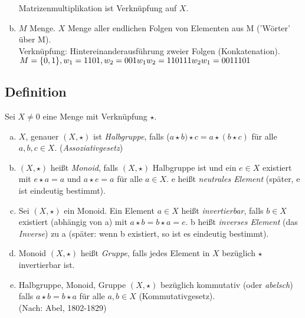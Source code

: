 \begin{enumerate}[a)]
Matrizenmultiplikation ist Verknüpfung auf $X$.
\item $M$ Menge. $X$ Menge aller endlichen Folgen von Elementen aus M ('Wörter' über M).\\
Verknüpfung: Hintereinanderausführung zweier Folgen (Konkatenation).\\
$M = \{0,1\}, w_1 = 1101, w_2 = 001\\
w_1w_2 = 110111\\
w_2w_1 = 0011101$\\
\end{enumerate}
\subsection{Definition}\label{sec:1.3}
Sei $X \ne 0$ eine Menge mit Verknüpfung $\star$.
\begin{enumerate}[a)]
\item $X$, genauer $(X,\star)$ ist \emph{Halbgruppe}, falls
($a \star b) \star c = a \star (b \star c)$ für alle $a,b,c \in X.$ (\emph{Assoziativgesetz})
\item $(X,\star)$ hei\ss t \emph{Monoid}, falls $(X,\star)$ Halbgruppe ist und ein $e \in X$ existiert mit $e \star a = a$ und $a \star e = a$ für alle $a \in X$. e hei\ss t \emph{neutrales Element} (später, e ist eindeutig bestimmt).
\item Sei $(X,\star)$ ein Monoid. Ein Element $a \in X$ hei\ss t \emph{invertierbar}, falls $b \in X$ existiert (abhängig von a) mit $a \star b = b \star a = e$. b hei\ss t \emph{inverses Element} (das \emph{Inverse}) zu a (später: wenn b existiert, so ist es eindeutig bestimmt).
\item Monoid $(X,\star)$ hei\ss t \emph{Gruppe}, falls jedes Element in $X$ bezüglich $\star$ invertierbar ist.
\item Halbgruppe, Monoid, Gruppe $(X,\star)$ bezüglich kommutativ (oder \emph{abelsch}) falls $a \star b = b \star a $ für alle $a,b \in X$ (Kommutativgesetz). \\(Nach: Abel, 1802-1829)
\end{enumerate}
